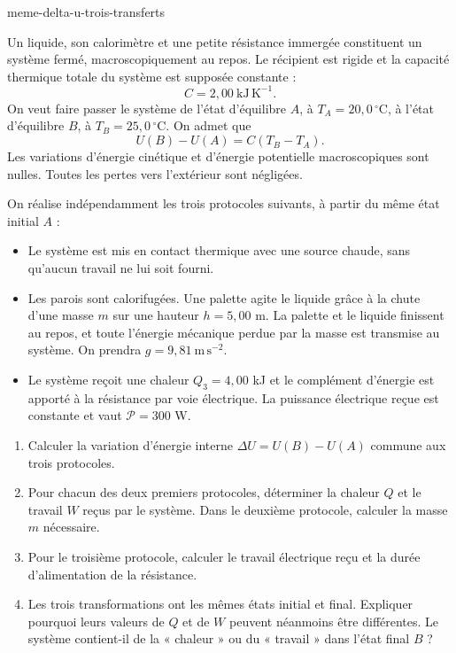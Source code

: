 \begin{exo}{meme-delta-u-trois-transferts}

Un liquide, son calorimètre et une petite résistance immergée constituent un
système fermé, macroscopiquement au repos. Le récipient est rigide et la
capacité thermique totale du système est supposée constante :
\[
C=2{,}00\ \mathrm{kJ\,K^{-1}}.
\]
On veut faire passer le système de l'état d'équilibre
$A$, à $T_A=20{,}0\,^\circ\mathrm{C}$, à l'état d'équilibre
$B$, à $T_B=25{,}0\,^\circ\mathrm{C}$. On admet que
\[
U(B)-U(A)=C(T_B-T_A).
\]
Les variations d'énergie cinétique et d'énergie potentielle macroscopiques
sont nulles. Toutes les pertes vers l'extérieur sont négligées.

On réalise indépendamment les trois protocoles suivants, à partir du même
état initial $A$ :
\begin{itemize}
\item[Protocole 1] Le système est mis en contact thermique avec une source chaude, sans
qu'aucun travail ne lui soit fourni.
\item[Protocole 2] Les parois sont calorifugées. Une palette agite le liquide grâce à la
chute d'une masse $m$ sur une hauteur $h=5{,}00$ m. La palette et le liquide
finissent au repos, et toute l'énergie mécanique perdue par la masse est
transmise au système. On prendra $g=9{,}81\ \mathrm{m\,s^{-2}}$.
\item[Protocole 3] Le système reçoit une chaleur $Q_3=4{,}00$ kJ et le complément
d'énergie est apporté à la résistance par voie électrique. La puissance
électrique reçue est constante et vaut $\mathcal P=300$ W.
\end{itemize}

\begin{enumerate}
\item Calculer la variation d'énergie interne $\Delta U=U(B)-U(A)$ commune
aux trois protocoles.
\item Pour chacun des deux premiers protocoles, déterminer la chaleur $Q$ et
le travail $W$ reçus par le système. Dans le deuxième protocole, calculer la
masse $m$ nécessaire.
\item Pour le troisième protocole, calculer le travail électrique reçu et la
durée d'alimentation de la résistance.
\item Les trois transformations ont les mêmes états initial et final.
Expliquer pourquoi leurs valeurs de $Q$ et de $W$ peuvent néanmoins être
différentes. Le système contient-il de la « chaleur » ou du « travail » dans
l'état final $B$ ?
\end{enumerate}


\end{exo}
